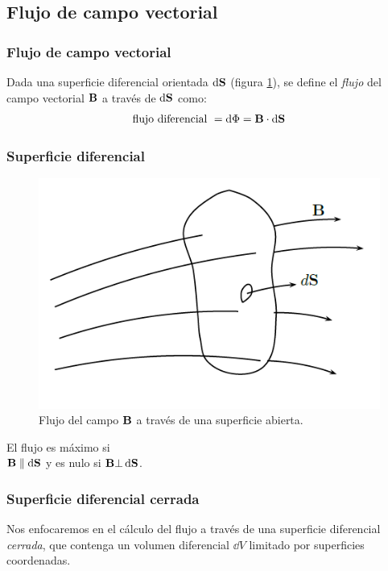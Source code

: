 \documentclass[12pt]{beamer}
\begin{document}
\subsection{Flujo de campo vectorial}

\begin{frame}
\frametitle{Flujo de campo vectorial}
Dada una superficie diferencial orientada $\dd{\vb{S}}$ (figura \ref{fig:figura_superficie_diferencial}), se define el \emph{flujo} del campo vectorial $\vb{B}$ a través de $\dd{\vb{S}}$ como:
\pause
\begin{align*}
\mbox{flujo diferencial } = \dd{\Phi} = \vb{B} \cdot \dd{\vb{S}}
\end{align*}
\end{frame}
\begin{frame}
\frametitle{Superficie diferencial}
\begin{minipage}{0.45\linewidth}
\begin{figure}[h!]
    \centering
    \includegraphics[scale=0.35]{Imagenes/Superficie_Diferencial.png}
    \caption{Flujo del campo $\vb{B}$ a través de una superficie abierta.}
    \label{fig:figura_superficie_diferencial}
\end{figure}
\end{minipage}
\hspace{1cm}
\pause
\begin{minipage}{0.4\linewidth}
\fontsize{12}{12} \selectfont
El flujo es máximo si \\ $\vb{B} \parallel \dd{\vb{S}}$ y es nulo si $\vb{B} \bot \dd{\vb{S}}$.
\end{minipage}
\end{frame}
\begin{frame}
\frametitle{Superficie diferencial cerrada}
Nos enfocaremos en el cálculo del flujo a través de una superficie diferencial \emph{cerrada}, que contenga un volumen diferencial $\dd{V}$ limitado por superficies coordenadas.
\end{frame}
\end{document}
